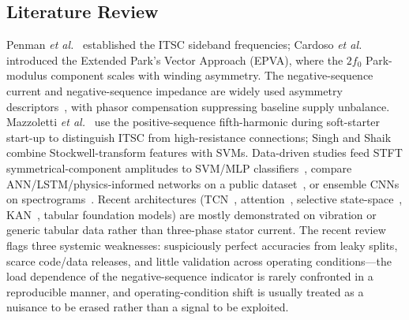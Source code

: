 \documentclass[journal]{IEEEtran}
\begin{document}
\subsection{Literature Review}
Penman \emph{et al.}~\cite{penman1994} established the ITSC sideband frequencies; Cardoso
\emph{et al.}~\cite{cardoso2001} introduced the Extended Park's Vector Approach (EPVA),
where the $2f_0$ Park-modulus component scales with winding asymmetry. The negative-sequence
current and negative-sequence impedance are widely used asymmetry
descriptors~\cite{garcia2024,ruzimov2025}, with phasor compensation suppressing baseline
supply unbalance. Mazzoletti \emph{et al.}~\cite{mazzoletti2025} use the positive-sequence
fifth-harmonic during soft-starter start-up to distinguish ITSC from high-resistance
connections; Singh and Shaik~\cite{singh2020} combine Stockwell-transform features with SVMs.
Data-driven studies feed STFT symmetrical-component amplitudes to SVM/MLP
classifiers~\cite{pietrzak2022}, compare ANN/LSTM/physics-informed networks on a public
dataset~\cite{aasar2026}, or ensemble CNNs on spectrograms~\cite{ali2025}. Recent
architectures (TCN~\cite{bai2018}, attention~\cite{vaswani2017}, selective state-space~\cite{gu2023},
KAN~\cite{liu2025}, tabular foundation models) are mostly demonstrated on vibration or
generic tabular data rather than three-phase stator current. The recent
review~\cite{hussain2025} flags three systemic weaknesses: suspiciously perfect accuracies
from leaky splits, scarce code/data releases, and little validation across operating
conditions---the load dependence of the negative-sequence indicator is rarely confronted in
a reproducible manner, and operating-condition shift is usually treated as a nuisance to be
erased rather than a signal to be exploited.
\end{document}
